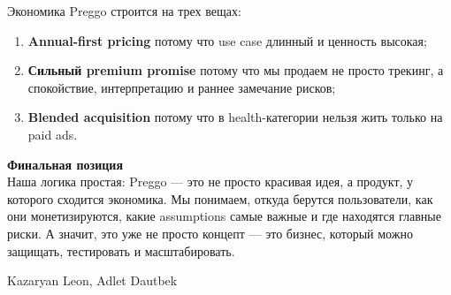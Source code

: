\documentclass[10pt,a4paper]{article}
\begin{document}
Экономика Preggo строится на трех вещах:

\begin{enumerate}
    \item \textbf{Annual-first pricing}  
    потому что use case длинный и ценность высокая;

    \item \textbf{Сильный premium promise}  
    потому что мы продаем не просто трекинг, а спокойствие, интерпретацию и раннее замечание рисков;

    \item \textbf{Blended acquisition}  
    потому что в health-категории нельзя жить только на paid ads.
\end{enumerate}

\vspace{3pt}

\begin{tcolorbox}[
    enhanced,
    breakable,
    colback=brandblush,
    colframe=brandcoraldeep,
    boxrule=0.9pt,
    arc=5pt,
    left=12pt,right=12pt,top=10pt,bottom=10pt,
    borderline west={3pt}{0pt}{brandcoraldeep}
]
{\color{brandcoraldeep}\Large\bfseries Финальная позиция}\\[6pt]
{\color{darktext}
Наша логика простая: Preggo --- это не просто красивая идея, а продукт, у которого сходится экономика. Мы понимаем, откуда берутся пользователи, как они монетизируются, какие assumptions самые важные и где находятся главные риски. А значит, это уже не просто концепт --- это бизнес, который можно защищать, тестировать и масштабировать.
}
\end{tcolorbox}

\vfill
\begin{center}
\textcolor{mutedtext}{Kazaryan Leon, Adlet Dautbek}
\end{center}
\end{document}

